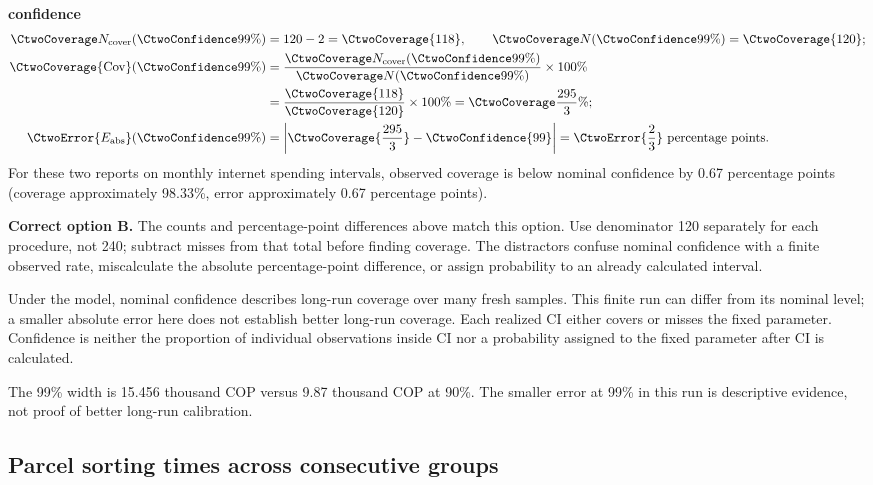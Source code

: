 \textbf{ confidence}\nopagebreak[4]
\begin{align*}
\CtwoCoverCount(\CtwoConfidence{99\%})&=120-2=\CtwoCoverage{118},
\qquad\CtwoTotalCount(\CtwoConfidence{99\%})=\CtwoCoverage{120};\\
\CtwoCoverage{\mathrm{Cov}}(\CtwoConfidence{99\%})
&=\frac{\CtwoCoverCount(\CtwoConfidence{99\%})}{\CtwoTotalCount(\CtwoConfidence{99\%})}\times100\%
\\
&=\frac{\CtwoCoverage{118}}{\CtwoCoverage{120}}\times100\%=\CtwoCoverage{\frac{295}{3}\%};\\
\CtwoError{E_{\rm abs}}(\CtwoConfidence{99\%})
&=\left|\CtwoCoverage{\frac{295}{3}}-\CtwoConfidence{99}\right|=\CtwoError{\frac{2}{3}}\ \text{percentage points}.
\end{align*}
For these two reports on monthly internet spending intervals, observed coverage is below nominal confidence by 0.67 percentage points (coverage approximately 98.33\%, error approximately 0.67 percentage points).

\textbf{Correct option B.} The counts and percentage-point differences above match this option. Use denominator 120 separately for each procedure, not 240; subtract misses from that total before finding coverage. The distractors confuse nominal confidence with a finite observed rate, miscalculate the absolute percentage-point difference, or assign probability to an already calculated interval.

Under the model, nominal confidence describes long-run coverage over many fresh samples. This finite run can differ from its nominal level; a smaller absolute error here does not establish better long-run coverage. Each realized $\mathrm{CI}$ either covers or misses the fixed parameter. Confidence is neither the proportion of individual observations inside $\mathrm{CI}$ nor a probability assigned to the fixed parameter after $\mathrm{CI}$ is calculated.

The 99\% width is 15.456 thousand COP versus 9.87 thousand COP at 90\%. The smaller error at 99\% in this run is descriptive evidence, not proof of better long-run calibration.
\par\nopagebreak[4]
\par\vspace{3mm}
\clearpage
\subsection{Parcel sorting times across consecutive groups}
\label{prob:c2-advanced-c}


